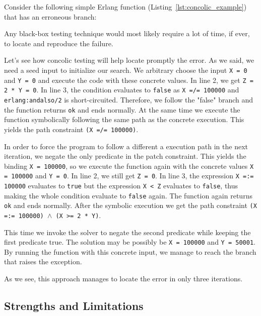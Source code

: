Consider the following simple Erlang function (Listing~\ref{lst:concolic_example}) 
that has an erroneous branch:


Any black-box testing technique would most likely require a lot of time, if ever, 
to locate and reproduce the failure. 

Let's see how concolic testing will help locate promptly the error. As we said, 
we need a seed input to initialize our search. We arbitrary choose the input 
\texttt{X = 0} and \texttt{Y = 0} and execute the code with these concrete 
values. In line 2, we get \texttt{Z = 2 * Y = 0}. In line 3, the condition 
evaluates to \texttt{false} as \texttt{X =/= 100000} and 
\texttt{erlang:andalso/2} is short-circuited. Therefore, we follow the 
"false" branch and the function returns \texttt{ok} and ends normally. At the 
same time we execute the function symbolically following the same path as the 
concrete execution. This yields the path constraint \texttt{(X =/= 100000)}.

In order to force the program to follow a different a execution path in the next 
iteration, we negate the only predicate in the patch constraint. This yields 
the binding \texttt{X = 100000}, so we execute the function again with the 
concrete values \texttt{X = 100000} and \texttt{Y = 0}. In line 2, we still get 
\texttt{Z = 0}. In line 3, the expression \texttt{X =:= 100000} evaluates 
to \texttt{true} but the expression \texttt{X < Z} evaluates to \texttt{false}, 
thus making the whole condition evaluate to \texttt{false} again. The function 
again returns \texttt{ok} and ends normally. After the symbolic execution we 
get the path constraint \texttt{(X =:= 100000) $\land$ (X >= 2 * Y)}.

This time we invoke the solver to negate the second predicate while keeping 
the first predicate true. The solution may be possibly be \texttt{X = 100000} 
and \texttt{Y = 50001}. By running the function with this concrete input, we 
manage to reach the branch that raises the exception.

As we see, this approach manages to locate the error in only three iterations.

\subsection{Strengths and Limitations}\label{subsec:concolic_strength_limitation}

